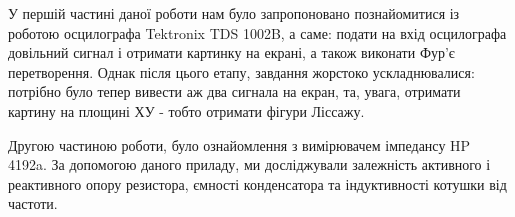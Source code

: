 
У першій частині даної роботи нам було запропоновано познайомитися із роботою осцилографа Tektronix TDS 1002B, а саме: подати на вхід осцилографа довільний сигнал і отримати картинку на екрані, а також виконати Фур'є перетворення. Однак після цього етапу, завдання жорстоко ускладнювалися: потрібно було тепер вивести аж два сигнала на екран, та, увага, отримати картину на площині ХУ - тобто отримати фігури Ліссажу.

Другою частиною роботи, було ознайомлення з вимірювачем імпедансу HP 4192a. За допомогою даного приладу, ми досліджували залежність активного і реактивного опору резистора, ємності конденсатора та індуктивності котушки від частоти.